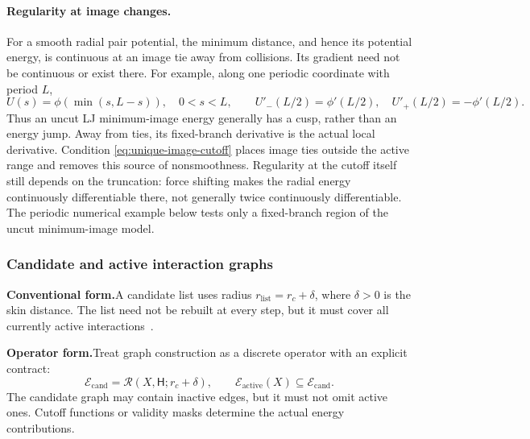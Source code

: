 \documentclass[11pt,a4paper]{article}
\newcommand{\oldform}{\par\noindent\textbf{Conventional form.}\quad}
\newcommand{\newform}{\par\noindent\textbf{Operator form.}\quad}
\newcommand{\cell}{\mathsf H}
\theoremstyle{definition}
\begin{document}
\paragraph{Regularity at image changes.}
For a smooth radial pair potential, the minimum distance, and hence its potential energy,
is continuous at an image tie away from collisions. Its gradient need not be continuous or
exist there. For example, along one periodic coordinate with period $L$,
\begin{equation}
U(s)=\phi\!\left(\min(s,L-s)\right),\quad 0<s<L,
\qquad
U'_-(L/2)=\phi'(L/2),\quad U'_+(L/2)=-\phi'(L/2).
\end{equation}
Thus an uncut LJ minimum-image energy generally has a cusp, rather than an energy jump.
Away from ties, its fixed-branch derivative is the actual local derivative. Condition
\eqref{eq:unique-image-cutoff} places image ties outside the active range and removes this
source of nonsmoothness. Regularity at the cutoff itself still depends on the truncation:
force shifting makes the radial energy continuously differentiable there, not generally twice
continuously differentiable. The periodic numerical example below tests only a fixed-branch
region of the uncut minimum-image model.

\subsubsection{Candidate and active interaction graphs}
\oldform A candidate list uses radius $r_{\mathrm{list}}=r_c+\delta$, where $\delta>0$ is the skin distance. The list need not be rebuilt at every step, but it must cover all currently active interactions~\cite{lammps-neighbor}.
\newform Treat graph construction as a discrete operator with an explicit contract:
\begin{equation}
\mathcal E_{\mathrm{cand}}=\mathcal R(X,\cell;r_c+\delta),\qquad
\mathcal E_{\mathrm{active}}(X)\subseteq\mathcal E_{\mathrm{cand}}.
\label{eq:neighbor-contract}
\end{equation}
The candidate graph may contain inactive edges, but it must not omit active ones. Cutoff
functions or validity masks determine the actual energy contributions.
\end{document}
